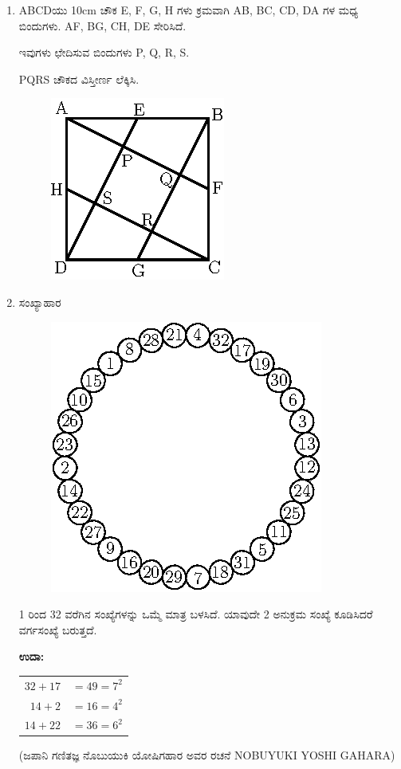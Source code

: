 \begin{enumerate}
\item ABCDಯು 10cm ಚೌಕ E, F, G, H ಗಳು ಕ್ರಮವಾಗಿ AB, BC, CD, DA ಗಳ ಮಧ್ಯ ಬಿಂದುಗಳು. AF, BG, CH, DE ಸೇರಿಸಿದೆ. 

ಇವುಗಳು ಛೇದಿಸುವ ಬಿಂದುಗಳು P, Q, R, S. 

PQRS ಚೌಕದ ವಿಸ್ತೀರ್ಣ ಲೆಕ್ಕಿಸಿ.

\begin{figure}[H]
\centering
\includegraphics{images/chap3/q29.eps}
\end{figure}

\item ಸಂಖ್ಯಾಹಾರ
\begin{figure}[H]
\centering
\includegraphics{images/chap3/q30.eps}
\end{figure}

1 ರಿಂದ 32 ವರೆಗಿನ ಸಂಖ್ಯೆಗಳನ್ನು ಒಮ್ಮೆ ಮಾತ್ರ ಬಳಸಿದೆ. ಯಾವುದೇ 2 ಅನುಕ್ರಮ ಸಂಖ್ಯೆ ಕೂಡಿಸಿದರೆ ವರ್ಗಸಂಖ್ಯೆ ಬರುತ್ತದೆ. 

{\bf ಉದಾ:}
\begin{tabular}[t]{rr}
$32 + 17$ & $= 49 = 7^{2}$\\
$14 + 2$ & $= 16 = 4^{2}$\\
$14 + 22$ & $= 36 = 6^{2}$
\end{tabular}

(ಜಪಾನಿ ಗಣಿತಜ್ಞ ನೊಬುಯುಕಿ ಯೋಷಿಗಹಾರ ಅವರ ರಚನೆ NOBUYUKI YOSHI GAHARA)
\end{enumerate}

